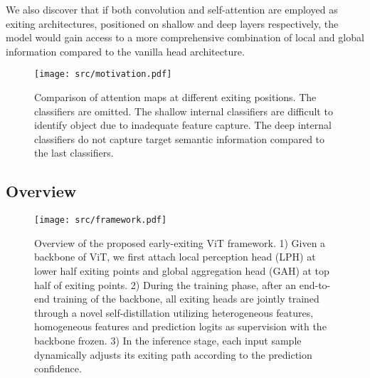 We also discover that if both convolution and self-attention are employed as exiting architectures, positioned on shallow and deep layers respectively, 
the model would gain access to a more comprehensive combination of local and global information compared to the vanilla head architecture. 

\begin{figure}
  \texttt{[image: src/motivation.pdf]}
  \vspace{-8pt}
  \caption{Comparison of attention maps at different exiting positions. 
  The classifiers are omitted. 
  The shallow internal classifiers are difficult to identify object due to inadequate feature capture. 
  The deep internal classifiers do not capture target semantic information compared to the last classifiers. 
  }
  \label{fig:motivation}
  \vspace{-10pt}
\end{figure}

\subsection{Overview}

\begin{figure*}
    \texttt{[image: src/framework.pdf]}
    \vspace{-6pt}
    \caption{Overview of the proposed early-exiting ViT framework. 
    1) Given a backbone of ViT, we first attach local perception head (LPH) at lower half exiting points and global aggregation head (GAH) at top half of exiting points. 
    2) During the training phase, after an end-to-end training of the backbone, 
    all exiting heads are jointly trained through a novel self-distillation utilizing heterogeneous features, homogeneous features and prediction logits as supervision with the backbone frozen. 
    3) In the inference stage, each input sample dynamically adjusts its exiting path according to the prediction confidence.}
    \label{fig:Overview}
    \vspace{-8pt}
  \end{figure*}

